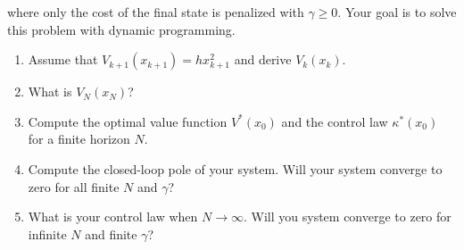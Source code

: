 where only the cost of the final state is penalized with $\gamma \geq 0$. Your goal is to solve this problem with dynamic programming.
\begin{enumerate}
    \item Assume that $V_{k+1}(x_{k+1}) = hx_{k+1}^2$ and derive $V_k(x_k)$.\vspace{3\baselineskip}
    \item What is $V_N(x_N)$?\vspace{3\baselineskip}
    \item Compute the optimal value function $V^*(x_0)$ and the control law $\kappa^*(x_0)$ for a finite horizon $N$.\vspace{3\baselineskip}
    \item Compute the closed-loop pole of your system. Will your system converge to zero for all finite $N$ and $\gamma$?\vspace{3\baselineskip}
    \item What is your control law when $N\rightarrow \infty$. Will you system converge to zero for infinite $N$ and finite $\gamma$?
\end{enumerate}